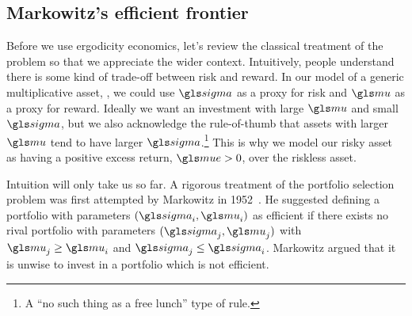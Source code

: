 \subsection{Markowitz's efficient frontier}

Before we use ergodicity economics, let's review the classical treatment of the problem so that we appreciate the wider context. Intuitively, people understand there is some kind of trade-off between risk and reward. In our model of a generic multiplicative asset, , we could use $\gsigma$ as a proxy for risk and $\gmu$ as a proxy for reward. Ideally we want an investment with large $\gmu$ and small $\gsigma$, but we also acknowledge the rule-of-thumb that assets with larger $\gmu$ tend to have larger $\gsigma$.\footnote{A ``no such thing as a free lunch'' type of rule.} This is why we model our risky asset as having a positive excess return, $\mue>0$, over the riskless asset.

Intuition will only take us so far. A rigorous treatment of the portfolio selection problem was first attempted by Markowitz in 1952~\cite{Markowitz1952}. He suggested defining a portfolio with parameters $(\gsigma_i, \gmu_i)$ as efficient if there exists no rival portfolio with parameters $(\gsigma_j, \gmu_j)$ with $\gmu_j\geq\gmu_i$ and $\gsigma_j\leq\gsigma_i$.
Markowitz argued that it is unwise to invest in a portfolio which is not efficient.

